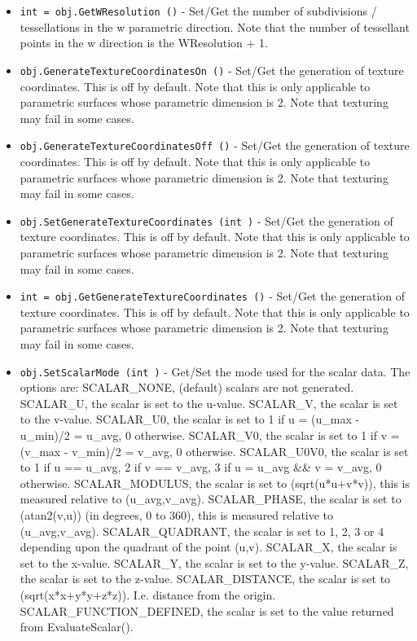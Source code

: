 \begin{itemize}
\item  \verb|int = obj.GetWResolution ()| -  Set/Get the number of subdivisions / tessellations in the w parametric
 direction. Note that the number of tessellant points in the w 
 direction is the WResolution + 1.

\item  \verb|obj.GenerateTextureCoordinatesOn ()| -  Set/Get the generation of texture coordinates. This is off by
 default.
 Note that this is only applicable to parametric surfaces 
 whose parametric dimension is 2.
 Note that texturing may fail in some cases.

\item  \verb|obj.GenerateTextureCoordinatesOff ()| -  Set/Get the generation of texture coordinates. This is off by
 default.
 Note that this is only applicable to parametric surfaces 
 whose parametric dimension is 2.
 Note that texturing may fail in some cases.

\item  \verb|obj.SetGenerateTextureCoordinates (int )| -  Set/Get the generation of texture coordinates. This is off by
 default.
 Note that this is only applicable to parametric surfaces 
 whose parametric dimension is 2.
 Note that texturing may fail in some cases.

\item  \verb|int = obj.GetGenerateTextureCoordinates ()| -  Set/Get the generation of texture coordinates. This is off by
 default.
 Note that this is only applicable to parametric surfaces 
 whose parametric dimension is 2.
 Note that texturing may fail in some cases.

\item  \verb|obj.SetScalarMode (int )| -  Get/Set the mode used for the scalar data.  The options are:
 SCALAR\_NONE, (default) scalars are not generated.
 SCALAR\_U, the scalar is set to the u-value. 
 SCALAR\_V, the scalar is set to the v-value.
 SCALAR\_U0, the scalar is set to 1 if u = (u\_max - u\_min)/2 = u\_avg, 0 otherwise.
 SCALAR\_V0, the scalar is set to 1 if v = (v\_max - v\_min)/2 = v\_avg, 0 otherwise.
 SCALAR\_U0V0, the scalar is 
   set to 1 if u == u\_avg, 2 if v == v\_avg, 3 if u = u\_avg \&\& v = v\_avg, 0 otherwise.
 SCALAR\_MODULUS, the scalar is set to (sqrt(u*u+v*v)), this is measured relative to (u\_avg,v\_avg).
 SCALAR\_PHASE, the scalar is set to (atan2(v,u)) (in degrees, 0 to 360), this is measured relative to (u\_avg,v\_avg).
 SCALAR\_QUADRANT, the scalar is set to 1, 2, 3 or 4 
   depending upon the quadrant of the point (u,v).
 SCALAR\_X, the scalar is set to the x-value. 
 SCALAR\_Y, the scalar is set to the y-value. 
 SCALAR\_Z, the scalar is set to the z-value. 
 SCALAR\_DISTANCE, the scalar is set to (sqrt(x*x+y*y+z*z)). I.e. distance from the origin.
 SCALAR\_FUNCTION\_DEFINED, the scalar is set to the value returned from EvaluateScalar().


\end{itemize}
